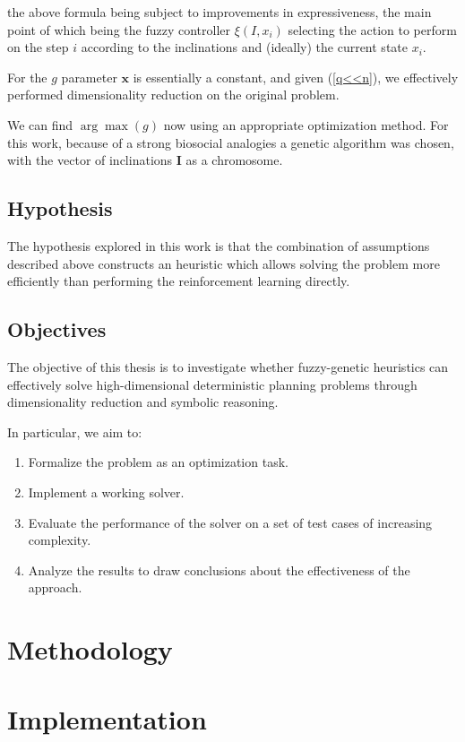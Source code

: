 \documentclass[11pt, a4paper]{article}
\begin{document}
	the above formula being subject to improvements in expressiveness,
	the main point of which being the fuzzy controller $\xi(I, x_i)$ selecting the action to perform on the step $i$ according to the inclinations and (ideally) the current state $x_i$.
	
	For the $g$ parameter $\mathbf{x}$ is essentially a constant, and given (\ref{q<<n}),
	we effectively performed dimensionality reduction on the original problem.
	
	We can find $\arg \max(g)$ now using an appropriate optimization method.
	For this work, because of a strong biosocial analogies a genetic algorithm\cite{mitchell1999geneticalgorithms} was chosen,
	with the vector of inclinations $\mathbf{I}$ as a chromosome.
	
	\subsection{Hypothesis}
	The hypothesis explored in this work is that the combination of assumptions described above constructs an heuristic which allows solving the problem more efficiently than performing the reinforcement learning directly.
	
	\subsection{Objectives}
	The objective of this thesis is to investigate whether fuzzy-genetic heuristics can effectively solve high-dimensional deterministic planning problems through dimensionality reduction and symbolic reasoning.
	
	In particular, we aim to:
	\begin{enumerate}
		\item Formalize the problem as an optimization task.
		\item Implement a working solver.
		\item Evaluate the performance of the solver on a set of test cases of increasing complexity.
		\item Analyze the results to draw conclusions about the effectiveness of the approach.
	\end{enumerate}

	\section{Methodology}



	\section{Implementation}
\end{document}
